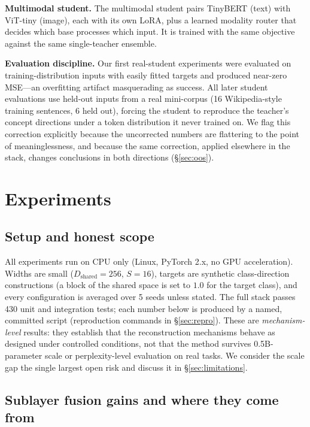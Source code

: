 \documentclass[10pt,twoside]{article}
\theoremstyle{definition}
\theoremstyle{plain}
\theoremstyle{remark}
\begin{document}
\textbf{Multimodal student.} The multimodal student pairs TinyBERT (text) with ViT-tiny (image), each with its own LoRA, plus a learned modality router that decides which base processes which input. It is trained with the same objective against the same single-teacher ensemble.

\textbf{Evaluation discipline.} Our first real-student experiments were evaluated on training-distribution inputs with easily fitted targets and produced near-zero MSE---an overfitting artifact masquerading as success. All later student evaluations use held-out inputs from a real mini-corpus (16 Wikipedia-style training sentences, 6 held out), forcing the student to reproduce the teacher's concept directions under a token distribution it never trained on. We flag this correction explicitly because the uncorrected numbers are flattering to the point of meaninglessness, and because the same correction, applied elsewhere in the stack, changes conclusions in both directions (\S\ref{sec:oos}).

\section{Experiments}
\label{sec:exp}

\subsection{Setup and honest scope}
\label{sec:exp-setup}

All experiments run on CPU only (Linux, PyTorch 2.x, no GPU acceleration). Widths are small ($D_{\text{shared}}{=}256$, $S{=}16$), targets are synthetic class-direction constructions (a block of the shared space is set to $1.0$ for the target class), and every configuration is averaged over 5 seeds unless stated. The full stack passes 430 unit and integration tests; each number below is produced by a named, committed script (reproduction commands in \S\ref{sec:repro}). These are \emph{mechanism-level} results: they establish that the reconstruction mechanisms behave as designed under controlled conditions, not that the method survives 0.5B-parameter scale or perplexity-level evaluation on real tasks. We consider the scale gap the single largest open risk and discuss it in \S\ref{sec:limitations}.

\subsection{Sublayer fusion gains and where they come from}
\label{sec:fusion-exp}
\end{document}

